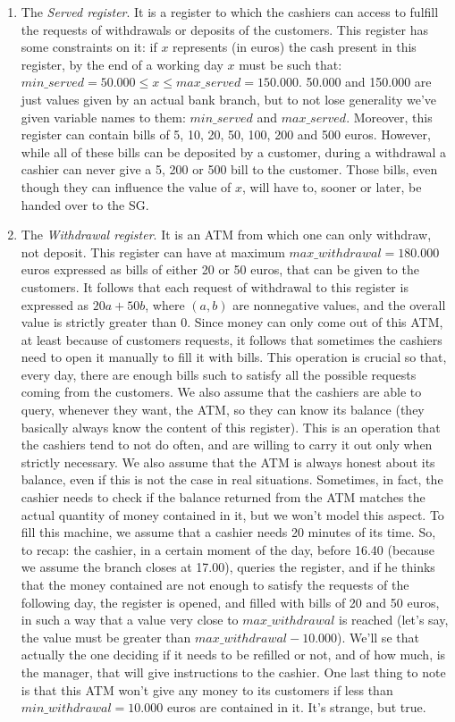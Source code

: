 \documentclass{article}
\begin{document}
\begin{enumerate}
\item The \emph{Served register}. It is a register to which the cashiers can access to fulfill the requests of withdrawals or deposits of the customers. This register has some constraints on it: if $x$ represents (in euros) the cash present in this register, by the end of a working day $x$ must be such that: $min\_served=50.000 \leq x \leq max\_served=150.000$. 50.000 and 150.000 are just values given by an actual bank branch, but to not lose generality we've given variable names to them: $min\_served$ and $max\_served$. Moreover, this register can contain bills of 5, 10, 20, 50, 100, 200 and 500 euros. However, while all of these bills can be deposited by a customer, during a withdrawal a cashier can never give a 5, 200 or 500 bill to the customer. Those bills, even though they can influence the value of $x$, will have to, sooner or later, be handed over to the SG.
\item The \emph{Withdrawal register}. It is an ATM from which one can only withdraw, not deposit. This register can have at maximum $max\_withdrawal = 180.000$ euros expressed as bills of either 20 or 50 euros, that can be given to the customers. It follows that each request of withdrawal to this register is expressed as $20a + 50b$, where $(a,b)$ are nonnegative values, and the overall value is strictly greater than $0$. Since money can only come out of this ATM, at least because of customers requests, it follows that sometimes the cashiers need to open it manually to fill it with bills. This operation is crucial so that, every day, there are enough bills such to satisfy all the possible requests coming from the customers. We also assume that the cashiers are able to query, whenever they want, the ATM, so they can know its balance (they basically always know the content of this register). This is an operation that the cashiers tend to not do often, and are willing to carry it out only when strictly necessary. We also assume that the ATM is always honest about its balance, even if this is not the case in real situations. Sometimes, in fact, the cashier needs to check if the balance returned from the ATM matches the actual quantity of money contained in it, but we won't model this aspect. To fill this machine, we assume that a cashier needs 20 minutes of its time. So, to recap: the cashier, in a certain moment of the day, before 16.40 (because we assume the branch closes at 17.00), queries the register, and if he thinks that the money contained are not enough to satisfy the requests of the following day, the register is opened, and filled with bills of 20 and 50 euros, in such a way that a value very close to $max\_withdrawal$ is reached (let's say, the value must be greater than $max\_withdrawal - 10.000$). We'll se that actually the one deciding if it needs to be refilled or not, and of how much, is the manager, that will give instructions to the cashier. One last thing to note is that this ATM won't give any money to its customers if less than $min\_withdrawal = 10.000$ euros are contained in it. It's strange, but true.

\end{enumerate}
\end{document}
